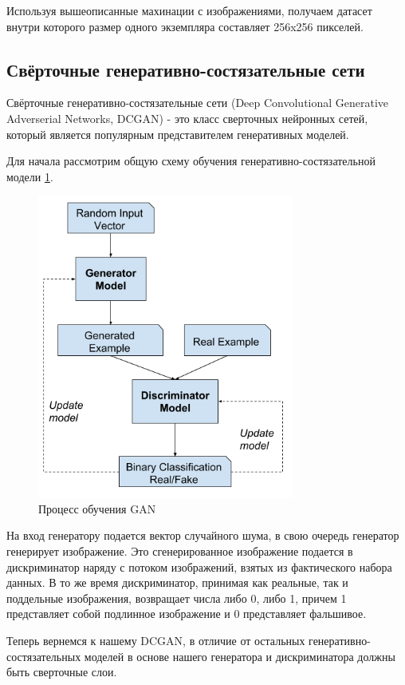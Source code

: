 Используя вышеописанные махинации с изображениями, получаем датасет внутри которого размер одного экземпляра составляет 256x256 пикселей.

\subsection{Свёрточные генеративно-состязательные сети}

\begin{definition}
    Свёрточные генеративно-состязательные сети (Deep Convolutional Generative Adverserial Networks, DCGAN) - это класс сверточных нейронных сетей, который является популярным представителем генеративных моделей\cite{dcgan}.
\end{definition}

Для начала рассмотрим общую схему обучения генеративно-состязательной модели {\color{blue} \ref{fig.GAN_fit_scheme}}.
\begin{figure}
    \centering
    \includegraphics[height=100mm]{fig/GAN_fit_scheme.png}
    \caption{Процесс обучения GAN}
    \label{fig.GAN_fit_scheme}
\end{figure}
На вход генератору подается вектор случайного шума, в свою очередь генератор генерирует изображение. Это сгенерированное изображение подается в дискриминатор наряду с потоком изображений, взятых из фактического набора данных. В то же время дискриминатор, принимая как реальные, так и поддельные изображения, возвращает числа либо 0, либо 1, причем 1 представляет собой подлинное изображение и 0 представляет фальшивое.

Теперь вернемся к нашему DCGAN, в отличие от остальных генеративно-состязательных моделей в основе нашего генератора и дискриминатора должны быть сверточные слои.


